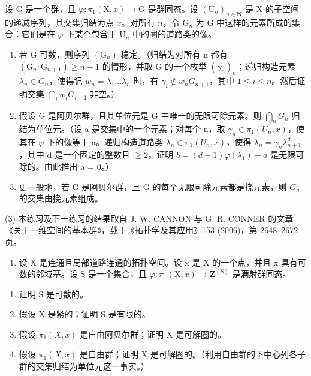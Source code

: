 设 G 是一个群，且 \(\varphi\colon\pi_{1}(\mathrm{X},x)\to\mathrm{G}\) 是群同态。设 \((\mathrm{U}_{n})_{n\in\mathbf{N}}\) 是 X 的子空间的递减序列，其交集归结为点 \(x\)。对所有 \(n\)，令 \(\mathrm{G}_{n}\) 为 G 中这样的元素所成的集合：它们是在 \(\varphi\) 下某个包含于 \(\mathrm{U}_{n}\) 中的圈的道路类的像。

\begin{enumerate}
\def\labelenumi{\alph{enumi})}
\item
  若 G 可数，则序列 \((\mathrm{G}_{n})\) 稳定。（归结为对所有 n 都有 \((\mathrm{G}_{n}:\mathrm{G}_{n+1})\geqslant n+1\) 的情形，并取 G 的一个枚举 \((\gamma_{n})_{n}\)；递归构造元素 \(\lambda_{n}\in G_{n}\)，使得记 \(w_{n}=\lambda_{1}\ldots\lambda_{n}\) 时，有 \(\gamma_{i}\notin w_{n}G_{n+1}\)，其中 \(1\leqslant i\leqslant n\)。然后证明交集 \(\bigcap_{i}w_{i}G_{i+1}\) 非空。）
\item
  假设 G 是阿贝尔群，且其单位元是 G 中唯一的无限可除元素。则 \(\bigcap_{n} G_{n}\) 归结为单位元。（设 a 是交集中的一个元素；对每个 n，取 \(\gamma_{n} \in \pi_{1}(U_{n}, x)\)，使其在 \(\varphi\) 下的像等于 a。递归构造道路类 \(\lambda_{n} \in \pi_{1}(U_{n}, x)\)，使得 \(\lambda_{n} = \gamma_{n}\lambda_{n+1}^{d}\)，其中 d 是一个固定的整数且 \(\geqslant 2\)。证明 \(b = (d - 1)\varphi(\lambda_{1}) + a\) 是无限可除的。由此推出 a = 0。）
\item
  更一般地，若 G 是阿贝尔群，且 G 的每个无限可除元素都是挠元素，则 \(G_{n}\) 的交集由挠元素组成。
\end{enumerate}

(3) 本练习及下一练习的结果取自 J. W. CANNON 与 G. R. CONNER 的文章《关于一维空间的基本群》，载于《拓扑学及其应用》153 (2006)，第 2648–2672 页。

\begin{enumerate}
\def\labelenumi{\arabic{enumi})}
\setcounter{enumi}{3}
\tightlist
\item
  设 X 是连通且局部道路连通的拓扑空间。设 x 是 X 的一个点，并且 x 具有可数的邻域基。设 S 是一个集合，且 \(\varphi\colon\pi_{1}(\mathrm{X},x)\to\mathbf{Z}^{(\mathrm{S})}\) 是满射群同态。
\end{enumerate}

\begin{enumerate}
\def\labelenumi{\alph{enumi})}
\item
  证明 S 是可数的。
\item
  假设 X 是紧的；证明 S 是有限的。
\item
  假设 \(\pi_{1}(X,x)\) 是自由阿贝尔群；证明 X 是可解圈的。
\item
  假设 \(\pi_{1}(X,x)\) 是自由群；证明 X 是可解圈的。（利用自由群的下中心列各子群的交集归结为单位元这一事实。）
\end{enumerate}

